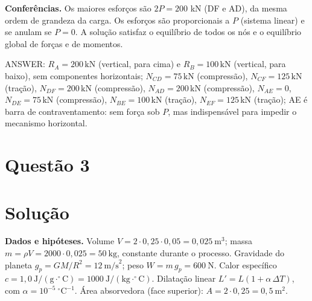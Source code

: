 \documentclass{article}%
\begin{document}
\textbf{Conferências.} Os maiores esforços são $2P=200$ kN (DF e AD), da mesma ordem de grandeza da carga. Os esforços são proporcionais a $P$ (sistema linear) e se anulam se $P=0$. A solução satisfaz o equilíbrio de todos os nós e o equilíbrio global de forças e de momentos.

ANSWER: $R_A=200\,\text{kN}$ (vertical, para cima) e $R_B=100\,\text{kN}$ (vertical, para baixo), sem componentes horizontais; $N_{CD}=75\,\text{kN}$ (compressão), $N_{CF}=125\,\text{kN}$ (tração), $N_{DF}=200\,\text{kN}$ (compressão), $N_{AD}=200\,\text{kN}$ (compressão), $N_{AE}=0$, $N_{DE}=75\,\text{kN}$ (compressão), $N_{BE}=100\,\text{kN}$ (tração), $N_{EF}=125\,\text{kN}$ (tração); AE é barra de contraventamento: sem força sob $P$, mas indispensável para impedir o mecanismo horizontal.%
\newpage%
\section*{Questão 3}

\section*{Solução}

\textbf{Dados e hipóteses.}
Volume $V = 2\cdot 0{,}25\cdot 0{,}05 = 0{,}025\ \mathrm{m}^3$; massa $m = \rho V = 2000\cdot 0{,}025 = 50\ \mathrm{kg}$, constante durante o processo. Gravidade do planeta $g_p = GM/R^2 = 12\ \mathrm{m/s}^2$; peso $W = m\,g_p = 600\ \mathrm{N}$. Calor específico $c = 1{,}0\ \mathrm{J/(g\cdot ^{\circ}C)} = 1000\ \mathrm{J/(kg\cdot ^{\circ}C)}$. Dilatação linear $L' = L(1+\alpha\,\Delta T)$, com $\alpha = 10^{-5}\ ^{\circ}\mathrm{C}^{-1}$. Área absorvedora (face superior): $A = 2\cdot 0{,}25 = 0{,}5\ \mathrm{m}^2$.
\end{document}
